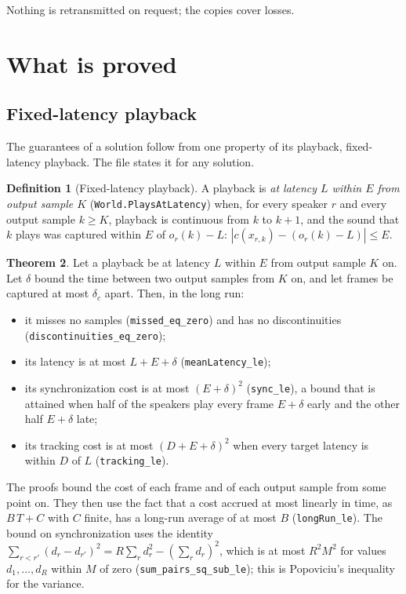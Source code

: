 \documentclass[11pt,a4paper]{article}
\newcommand{\lean}[1]{\texttt{#1}}
\theoremstyle{definition}
\newtheorem{definition}{Definition}[section]
\newtheorem{theorem}[definition]{Theorem}
\begin{document}
Nothing is retransmitted on request; the copies cover losses.

\section{What is proved}

\subsection{Fixed-latency playback}

The guarantees of a solution follow from one property of its playback,
fixed-latency playback. The file 
states it for any solution.

\begin{definition}[Fixed-latency playback]
A playback is \emph{at latency $L$ within $E$ from output sample $K$}
(\lean{World.PlaysAtLatency}) when, for every speaker $r$ and every output
sample $k \ge K$, playback is continuous from $k$ to $k + 1$, and the sound
that $k$ plays was captured within $E$ of $o_r(k) - L$:
$|c(x_{r,k}) - (o_r(k) - L)| \le E$.
\end{definition}

\begin{theorem}\label{thm:atlatency}
Let a playback be at latency $L$ within $E$ from output sample $K$ on. Let
$\delta$ bound the time between two output samples from $K$ on, and let
frames be captured at most $\delta_c$ apart. Then, in the long run:
\begin{itemize}
\item it misses no samples (\lean{missed\_eq\_zero}) and has no
  discontinuities (\lean{discontinuities\_eq\_zero});
\item its latency is at most $L + E + \delta$ (\lean{meanLatency\_le});
\item its synchronization cost is at most $(E + \delta)^2$
  (\lean{sync\_le}), a bound that is attained when half of the speakers
  play every frame $E + \delta$ early and the other half $E + \delta$ late;
\item its tracking cost is at most $(D + E + \delta)^2$ when every target
  latency is within $D$ of $L$ (\lean{tracking\_le}).
\end{itemize}
\end{theorem}

The proofs bound the cost of each frame and of each output sample from some
point on. They then use the fact that a cost accrued at most linearly in
time, as $B\,T + C$ with $C$ finite, has a long-run average of at most $B$
(\lean{longRun\_le}). The bound on synchronization uses the identity
$\sum_{r < r'} (d_r - d_{r'})^2 = R \sum_r d_r^2 - (\sum_r d_r)^2$, which is
at most $R^2 M^2$ for values $d_1, \dots, d_R$ within $M$ of zero
(\lean{sum\_pairs\_sq\_sub\_le}); this is Popoviciu's inequality for the
variance.
\end{document}
